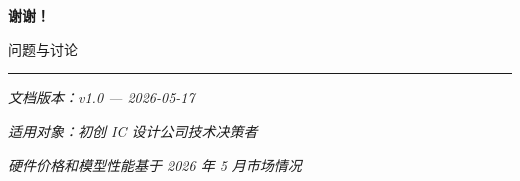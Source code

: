\documentclass[UTF8,11pt,aspectratio=169]{beamer}
\begin{document}
\section{}

\begin{frame}
  \begin{center}
    \Huge
    \textbf{谢谢！}

    \vspace{1em}
    \Large
    问题与讨论

    \vspace{2em}
    \normalsize
    \rule{0.5\textwidth}{0.4pt}

    \vspace{0.5em}
    \textit{文档版本：v1.0 --- 2026-05-17}

    \textit{适用对象：初创 IC 设计公司技术决策者}

    \textit{硬件价格和模型性能基于 2026 年 5 月市场情况}
  \end{center}
\end{frame}
\end{document}
